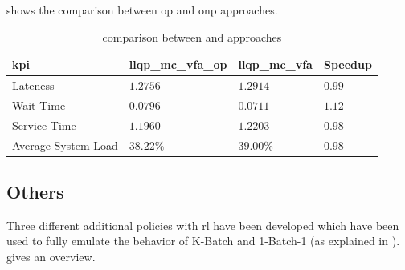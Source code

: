 \documentclass[draft=false]{seal_thesis}
\begin{document}
 shows the comparison between \gls{op} and \gls{onp} approaches.

\begin{table}[!ht]
\centering
\begin{tabular}{@{}llll@{}}
\toprule
\gls{kpi}                 & llqp\_mc\_vfa\_op & llqp\_mc\_vfa & Speedup \\ \midrule
Lateness            & $1.2756$                  & $1.2914$              & $0.99$                   \\
Wait Time           & $0.0796$                  & $0.0711$              & $1.12$                   \\
Service Time        & $1.1960$                  & $1.2203$              & $0.98$                   \\
Average System Load & $38.22\%$                  & $39.00\%$              & $0.98$                   \\ \bottomrule
\end{tabular}
\caption{ comparison between  and  approaches}
\label{tab:llqp_mc_vfa_op_vs_on}
\end{table}

\subsection{Others}
\label{subsec:rl_others}

Three different additional policies with \gls{rl} have been developed which have been used to fully emulate the behavior of K-Batch and 1-Batch-1 (as explained in ).  gives an overview.

\begin{table}[!ht]
\centering
{}
\caption{Overview of additional developed policies with }
\label{tab:rl_others_policies_overview}
\end{table}
\end{document}
